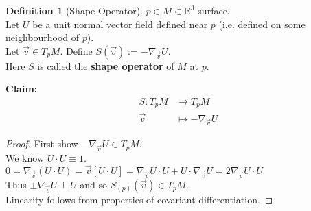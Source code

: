 \documentclass{article}
\newcommand{\R}{\mathbb{R}}
\theoremstyle{definition}
\newtheorem{definition}{Definition}[section]
\theoremstyle{remark}
\theoremstyle{example}
\begin{document}
	\begin{definition}[Shape Operator]
		$p \in M \subset \R^3$ surface.\\
		Let $U$ be a unit normal vector field defined near $p$ (i.e. defined on some neighbourhood of $p$).\\
		Let $\vec{v} \in T_pM$. Define $S(\vec{v}):=-\nabla_{\vec{v}}U$.\\
		Here $S$ is called the \textbf{shape operator} of $M$ at $p$.
	\end{definition}

	\textbf{Claim: } \begin{align*}
		S:T_pM&\to T_pM\\
		\vec{v} & \mapsto -\nabla_{\vec{v}}U
	\end{align*}
	\begin{proof}
		First show $-\nabla_{\vec{v}}U \in T_pM$.\\
		We know $U \cdot U \equiv 1$.\\
		$0=\nabla_{\vec{v}}(U \cdot U) = \vec{v}[U \cdot U]=\nabla_{\vec{v}}U\cdot U + U \cdot \nabla_{\vec{v}}U = 2 \nabla_{\vec{v}} U \cdot U$\\
		Thus $\pm \nabla_{\vec{v}}U \perp U$ and so $S_{(p)}(\vec{v}) \in T_pM$.\\
		Linearity follows from properties of covariant differentiation.
	\end{proof}
\end{document}

